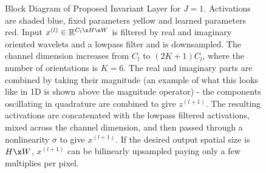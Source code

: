 \begin{figure}[t!]
{

  }
  \caption{Block Diagram of Proposed Invariant Layer for $J=1$. Activations are shaded
  blue, fixed parameters yellow and learned parameters red. Input
  $x^{(l)}\in \mathbb{R}^{C_l\x H\x W}$ is filtered by real and imaginary oriented
  wavelets and a lowpass filter and is downsampled. The channel dimension
  increases from $C_l$ to $(2K+1)C_l$, where the number of orientations is $K=6$.
  The real and imaginary parts are combined by taking their magnitude (an
  example of what this looks like in 1D is shown above the magnitude operator) -
  the components oscillating in quadrature are combined to give $z^{(l+1)}$. The
  resulting activations are concatenated with the lowpass filtered activations,
  mixed across the channel dimension, and then passed through a nonlinearity
  $\sigma$ to give $x^{(l+1)}$.  If the desired output spatial size is $H\x W$,
  $x^{(l+1)}$ can be bilinearly upsampled paying only a few multiplies per
  pixel.}
  \label{fig:block_diagram}
\end{figure}

